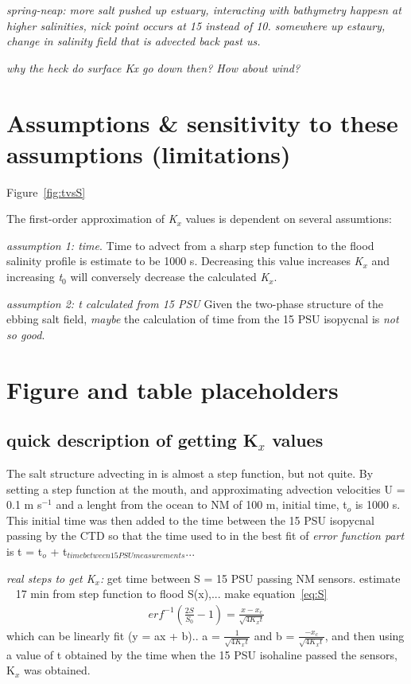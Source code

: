 \emph{spring-neap:
more salt pushed up estuary, interacting with bathymetry happesn at higher salinities, nick point occurs at 15 instead of 10. somewhere up estaury, change in salinity field that is advected back past us. }


\emph{why the heck do surface Kx go down then? How about wind?}

\section{Assumptions \& sensitivity to these assumptions (limitations)}

Figure~\ref{fig:tvsS}

The first-order approximation of \emph{K$_x$} values is dependent on several assumtions: 

\emph{assumption 1: time}. Time to advect from a sharp step function to the flood salinity profile is estimate to be 1000 s. Decreasing this value increases \emph{K$_x$} and increasing \emph{t$_0$} will conversely decrease the calculated \emph{K$_x$}. 

\emph{assumption 2: t calculated from 15 PSU} Given the two-phase structure of the ebbing salt field, \emph{maybe} the calculation of time from the 15 PSU isopycnal is \emph{not so good}. 


\section{Figure and table placeholders}



\subsection{quick description of getting K$_x$ values}
The salt structure advecting in is almost a step function, but not quite. By setting a step function at the mouth, and approximating advection velocities U = 0.1 m s$^{-1}$ and a lenght from the ocean to NM of 100 m, initial time, t$_o$ is 1000 s. This initial time was then added to the time between the 15 PSU isopycnal passing by the CTD so that the time used to in the best fit of \emph{error function part} is t = t$_o$ + t$_{time between 15 PSU measurements}$... 

\emph{real steps to get K$_x$:} get time between S = 15 PSU passing NM sensors.  estimate ~ 17 min from step function to flood S(x),... make equation~\ref{eq:S} 
\begin{eqnarray}
erf^{-1}\left(\frac{2S}{S_0}-1\right) = \frac{x-x_c}{\sqrt{4K_xt}} \label{eq:linfitS}
\end{eqnarray}
which can be linearly fit (y = ax + b).. a = $\frac{1}{\sqrt{4K_xt}}$ and b = $\frac{-x_c}{\sqrt{4K_xt}}$, and then using a value of t obtained by the time when the 15 PSU isohaline passed the sensors, K$_x$ was obtained.  



